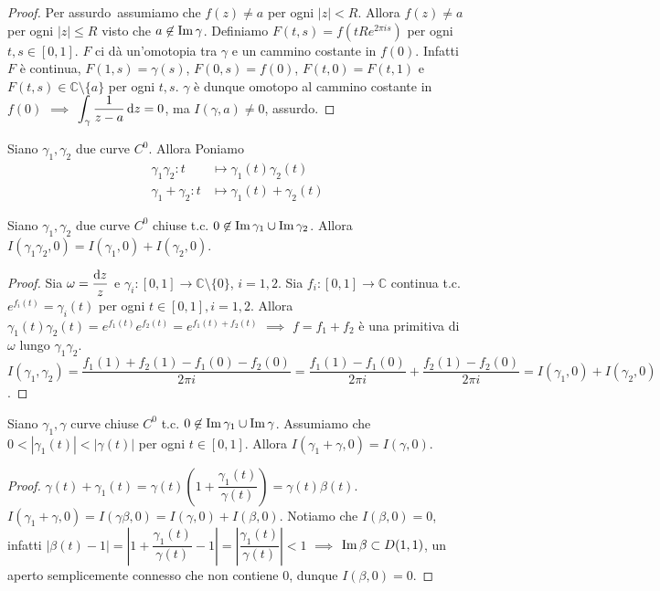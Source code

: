 \begin{proof}
  Per assurdo\ assumiamo che $f(z)\not=a$ per ogni $|z|<R$. Allora $f(z)\not=a$ per ogni $|z| \le R$ visto che $a \not\in \operatorname{Im}{\gamma}$. Definiamo $F(t,s)=f(tRe^{2\pi is})$ per ogni $t,s \in [0,1]$. $F$ ci dà un'omotopia tra $\gamma$ e un cammino costante in $f(0)$.
  Infatti $F$ è continua, $F(1,s)=\gamma(s)$, $F(0,s)=f(0)$, $F(t,0)=F(t,1)$ e $F(t, s) \in \mathbb{C}\setminus\{a\}$ per ogni $t, s$. $\gamma$ è dunque omotopo al cammino costante in $f(0)$ $\implies$ $\displaystyle \int_{\gamma} \frac{1}{z-a}\mathop{}\!\mathrm{d} z=0$, ma $I(\gamma, a)\not=0$, assurdo.
\end{proof}

\begin{defn}
  Siano $\gamma_1, \gamma_2$ due curve $C^0$. Allora Poniamo
  \begin{align*}
    \gamma_1\gamma_2:t &\longmapsto \gamma_1(t)\gamma_2(t)\\
    \gamma_1+\gamma_2:t &\longmapsto \gamma_1(t)+\gamma_2(t)
  \end{align*}
\end{defn}

\begin{thm}
  Siano $\gamma_1, \gamma_2$ due curve $C^0$ chiuse t.c. $0 \not\in \operatorname{Im}{\gamma_1}\cup\operatorname{Im}{\gamma_2}$. Allora $I(\gamma_1\gamma_2, 0)=I(\gamma_1, 0)+I(\gamma_2, 0)$.
\end{thm}

\begin{proof}
  Sia $\omega=\dfrac{\mathop{}\!\mathrm{d} z}{z}$ e $\gamma_i:[0,1] \longrightarrow \mathbb{C}\setminus\{0\}$, $i=1,2$. Sia $f_i:[0,1] \longrightarrow \mathbb{C}$ continua t.c. $e^{f_i(t)}=\gamma_i(t)$ per ogni $t \in [0,1], i=1,2$.
  Allora $\gamma_1(t)\gamma_2(t)=e^{f_1(t)}e^{f_2(t)}=e^{f_1(t)+f_2(t)}$ $\implies$ $f=f_1+f_2$ è una primitiva di $\omega$ lungo $\gamma_1\gamma_2$. $I(\gamma_1, \gamma_2)=\dfrac{f_1(1)+f_2(1)-f_1(0)-f_2(0)}{2\pi i}=\dfrac{f_1(1)-f_1(0)}{2\pi i}+\dfrac{f_2(1)-f_2(0)}{2\pi i}=I(\gamma_1, 0)+I(\gamma_2, 0)$.
\end{proof}

\begin{thm}
  Siano $\gamma_1, \gamma$ curve chiuse $C^0$ t.c. $0 \not\in \operatorname{Im}{\gamma_1}\cup\operatorname{Im}{\gamma}$. Assumiamo che $0<|\gamma_1(t)|<|\gamma(t)|$ per ogni $t \in [0,1]$. Allora $I(\gamma_1+\gamma, 0)=I(\gamma, 0)$.
\end{thm}

\begin{proof}
  $\gamma(t)+\gamma_1(t)=\gamma(t)\left(1+\dfrac{\gamma_1(t)}{\gamma(t)}\right)=\gamma(t)\beta(t)$. $I(\gamma_1+\gamma, 0)=I(\gamma\beta, 0)=I(\gamma, 0)+I(\beta, 0)$.
  Notiamo che $I(\beta, 0)=0$, infatti $|\beta(t)-1|=\left|1+\dfrac{\gamma_1(t)}{\gamma(t)}-1 \right|=\left|\dfrac{\gamma_1(t)}{\gamma(t)} \right|<1$ $\implies$ $\operatorname{Im}{\beta} \subset D(1,1)$, un aperto semplicemente connesso che non contiene $0$, dunque $I(\beta, 0)=0$.
\end{proof}

